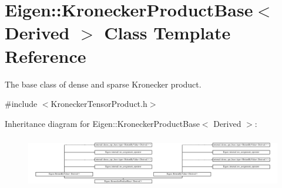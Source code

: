 \hypertarget{class_eigen_1_1_kronecker_product_base}{}\section{Eigen\+:\+:Kronecker\+Product\+Base$<$ Derived $>$ Class Template Reference}
\label{class_eigen_1_1_kronecker_product_base}


The base class of dense and sparse Kronecker product.  




{\ttfamily \#include $<$Kronecker\+Tensor\+Product.\+h$>$}

Inheritance diagram for Eigen\+:\+:Kronecker\+Product\+Base$<$ Derived $>$\+:\begin{figure}[H]
\begin{center}
\leavevmode
\includegraphics[height=2.276423cm]{class_eigen_1_1_kronecker_product_base}
\end{center}
\end{figure}
